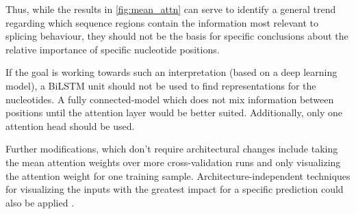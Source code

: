 Thus, while the results in \ref{fig:mean_attn} can serve to identify a general trend regarding which sequence regions contain the information most relevant to splicing behaviour, they should not be the basis for specific conclusions about the relative importance of specific nucleotide positions. 

If the goal is working towards such an interpretation (based on a deep learning model), a BiLSTM unit should not be used to find representations for the nucleotides. A fully connected-model which does not mix information between positions until the attention layer would be better suited. Additionally, only one attention head should be used. 

Further modifications, which don't require architectural changes include taking the mean attention weights over more cross-validation runs and only visualizing the attention weight for one training sample. Architecture-independent techniques for visualizing the inputs with the greatest impact for a specific prediction could also be applied \cite{deeplift}.

%

















